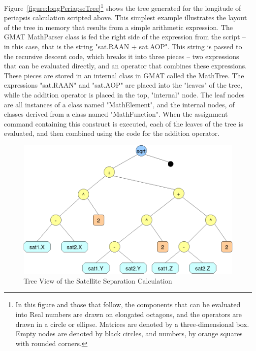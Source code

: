 Figure~\ref{figure:longPeriapseTree}\footnote{In this figure and those that follow, the components
that can be evaluated into Real numbers are drawn on elongated octagons, and the operators are drawn
in a circle or ellipse.  Matrices are denoted by a three-dimensional box.  Empty nodes are denoted
by black circles, and numbers, by orange squares with rounded corners.} shows the tree generated for
the longitude of periapsis calculation scripted above.  This simplest example illustrates the layout
of the tree in memory that results from a simple arithmetic expression. The GMAT MathParser class is
fed the right side of the expression from the script -- in this case, that is the string "sat.RAAN +
sat.AOP".  This string is passed to the recursive descent code, which breaks it into three pieces --
two expressions that can be evaluated directly, and an operator that combines these expressions. 
These pieces are stored in an internal class in GMAT called the MathTree.  The expressions
"sat.RAAN" and "sat.AOP" are placed into the "leaves" of the tree, while the addition operator is
placed in the top, "internal" node.  The leaf nodes are all instances of a class named
"MathElement", and the internal nodes, of classes derived from a class named "MathFunction".  When
the assignment command containing this construct is executed, each of the leaves of the tree is
evaluated, and then combined using the code for the addition operator.

\begin{figure}[tb]
\begin{center}
\includegraphics[430,268]{Images/satSep.png}
\caption{\label{figure:satelliteSeparationTree}Tree View of the Satellite
Separation Calculation}
\end{center}
\end{figure}

